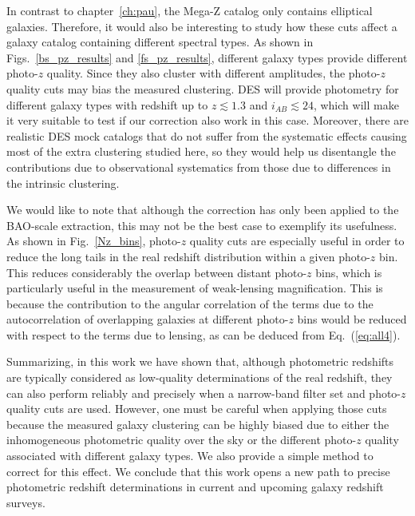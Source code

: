 In contrast to chapter~\ref{ch:pau}, the Mega-Z catalog only contains elliptical galaxies. Therefore, it would also be interesting to study how these cuts affect a galaxy catalog containing different spectral types. As shown in Figs.~\ref{bs_pz_results} and \ref{fs_pz_results}, different galaxy types provide different photo-$z$ quality. Since they also cluster with different amplitudes, the photo-$z$ quality cuts may bias the measured clustering. DES will provide photometry for different galaxy types with redshift up to $z\lesssim1.3$ and $i_{AB}\lesssim24$, which will make it very suitable to test if our correction also work in this case. Moreover, there are realistic DES mock catalogs that do not suffer from the systematic effects causing most of the extra clustering studied here, so they would help us disentangle the contributions due to observational systematics from those due to differences in the intrinsic clustering. 

We would like to note that although the correction has only been applied to the BAO-scale extraction, this may not be the best case to exemplify its usefulness. As shown in Fig.~\ref{Nz_bins}, photo-$z$ quality cuts are especially useful in order to reduce the long tails in the real redshift distribution within a given photo-$z$ bin. This reduces considerably the overlap between distant photo-$z$ bins, which is particularly useful in the measurement of weak-lensing magnification. This is because the contribution to the angular correlation of the terms due to the autocorrelation of overlapping galaxies at different photo-$z$ bins would be reduced with respect to the terms due to lensing, as can be deduced from Eq.~(\ref{eq:all4}).

Summarizing, in this work we have shown that, although photometric redshifts are typically considered as low-quality determinations of the real redshift, they can also perform reliably and precisely when a narrow-band filter set and photo-$z$ quality cuts are used. However, one must be careful when applying those cuts because the measured galaxy clustering can be highly biased due to either the inhomogeneous photometric quality over the sky or the different photo-$z$ quality associated with different galaxy types. We also provide a simple method to correct for this effect. We conclude that this work opens a new path to precise photometric redshift determinations in current and upcoming galaxy redshift surveys.
